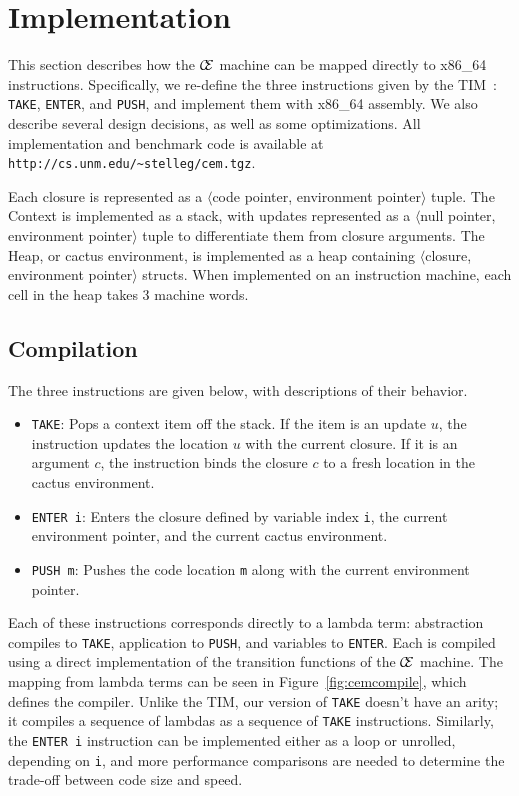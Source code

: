 \section{Implementation} \label{sec:impl}

This section describes how the $\mathcal{\mathcal{C} \mskip -4mu \mathcal{E}}$
machine can be mapped directly to x86\_64 instructions. Specifically, we re-define
the three instructions given by the TIM~\cite{TIM}: \texttt{TAKE},
\texttt{ENTER}, and \texttt{PUSH}, and implement them with x86\_64 assembly.  We 
also describe several design decisions, as well as some optimizations. All
implementation and benchmark code is available at
\texttt{http://cs.unm.edu/\textasciitilde stelleg/cem.tgz}.

Each closure is represented as a $\langle$code pointer, environment
pointer$\rangle$ tuple. The
Context is implemented as a stack, with updates represented as a $\langle$null pointer,
environment pointer$\rangle$ tuple to differentiate them from closure arguments. The
Heap, or cactus environment, is implemented as a heap containing $\langle$closure,
environment pointer$\rangle$ structs. When implemented on an instruction
machine, each cell in the heap takes 3 machine words.

\subsection{Compilation}
The three instructions are given below, with descriptions of their behavior. 

\begin{itemize}
\item \texttt{TAKE}: Pops a context item off the stack. If the item is an
update $u$, the instruction updates the location $u$ with the current closure.
If it is an argument $c$, the instruction binds the closure $c$ to a fresh
location in the cactus environment.
\item \texttt{ENTER i}: Enters the closure defined by variable index \texttt{i},
the current environment pointer, and the current cactus environment.  \item
\texttt{PUSH m}: Pushes the code location \texttt{m} along with the
current environment pointer. 
\end{itemize}

Each of these instructions corresponds directly to a lambda term: abstraction
compiles to \texttt{TAKE}, application to \texttt{PUSH}, and variables to
\texttt{ENTER}. Each is compiled using a direct implementation of the transition
functions of the $\mathcal{\mathcal{C} \mskip -4mu \mathcal{E}}$ machine. The
mapping from lambda terms can be seen in Figure~\ref{fig:cemcompile}, which
defines the compiler. Unlike the TIM, our version of \texttt{TAKE} doesn't have
an arity; it compiles a sequence of lambdas as a sequence of \texttt{TAKE}
instructions. Similarly, the \texttt{ENTER i} instruction can be implemented
either as a loop or unrolled, depending on \texttt{i}, and more performance
comparisons are needed to determine the trade-off between code size and speed.

